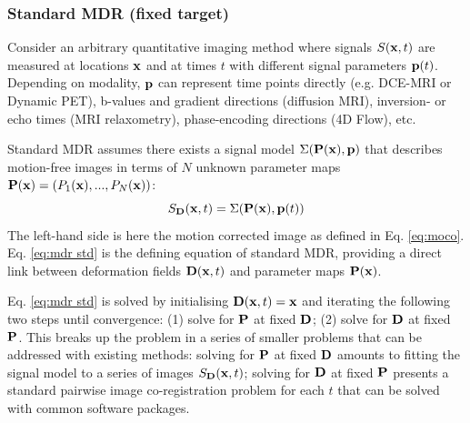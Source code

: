 \documentclass[num-refs]{wiley-article}
\newcommand{\x}{{\bf x}}
\newcommand{\D}{{\bf D}}
\newcommand{\Pb}{{\bf P}}
\newcommand{\pb}{{\bf p}}
\begin{document}
\subsubsection{Standard MDR (fixed target)}

Consider an arbitrary quantitative imaging method where signals $S(\x, t)$ are measured at locations $\x$ and at times $t$ with different signal parameters $\pb (t)$. Depending on modality, $\pb $ can represent time points directly (e.g. DCE-MRI or Dynamic PET), b-values and gradient directions (diffusion MRI), inversion- or echo times (MRI relaxometry), phase-encoding directions (4D Flow), etc. 

Standard MDR assumes there exists a signal model $\Sigma (\Pb(\x), \pb)$ that describes motion-free images in terms of $N$ unknown parameter maps $\Pb(\x) = (P_1(\x),...,P_N(\x))$:
\begin{equation}\label{eq:mdr std}
S_\D(\x, t) = \Sigma(\Pb(\x), \pb (t))  
\end{equation}
The left-hand side is here the motion corrected image as defined in Eq. \ref{eq:moco}. Eq. \ref{eq:mdr std} is the defining equation of standard MDR, providing a direct link between deformation fields $\D(\x,t)$ and parameter maps $\Pb(\x)$.

Eq. \ref{eq:mdr std} is solved by initialising $\D(\x, t)=\x$ and iterating the following two steps until convergence: (1) solve for $\Pb$ at fixed $\D$; (2) solve for $\D$ at fixed $\Pb$. This breaks up the problem in a series of smaller problems that can be addressed with existing methods: solving for $\Pb$ at fixed $\D$ amounts to fitting the signal model to a series of images $S_\D(\x, t)$; solving for $\D$ at fixed $\Pb$ presents a standard pairwise image co-registration problem for each $t$ that can be solved with common software packages.
\end{document}
